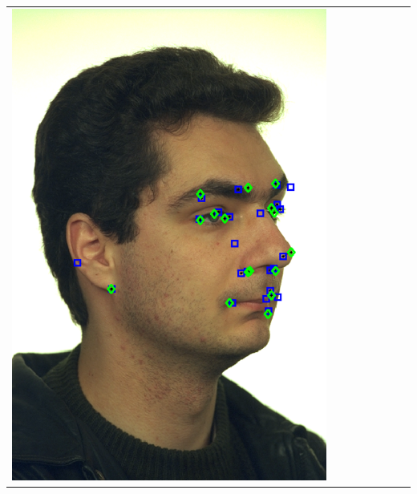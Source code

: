 \documentclass[portrait,final,a0paper,fontscale=0.277]{baposter}
\begin{document}
\begin{poster}
{{\begin{tabular}{@{}rccccccc@{}}
\parbox[c]{0.11\linewidth}{\includegraphics[width=\linewidth]{images/l_hr_success_2.pdf}} &

\end{tabular}}}
\end{poster}
\end{document}
